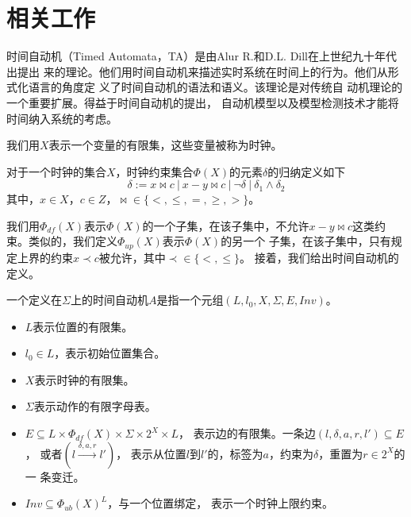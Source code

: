 
\chapter{相关工作}
\label{cha:related_work}


时间自动机（Timed Automata，TA）是由Alur R.和D.L. Dill在上世纪九十年代出提出
来的理论。他们用时间自动机来描述实时系统在时间上的行为。他们从形式化语言的角度定
义了时间自动机的语法和语义\cite{Alur:1994:TTA:180782.180519}。该理论是对传统自
动机理论\cite{Hopcroft:2006:IAT:1196416}的一个重要扩展。得益于时间自动机的提出，
自动机模型以及模型检测技术\cite{Clarke:2000:MC:332656}才能将时间纳入系统的考虑。

我们用$X$表示一个变量的有限集，这些变量被称为时钟。
\begin{definition}
	\label{def:constraint}
	对于一个时钟的集合$X$，时钟约束集合$\varPhi(X)$的元素$\delta$的归纳定义如下
	\begin{equation}
		\delta := x \bowtie c ~|~ x-y \bowtie c~|~ \neg\delta ~|~ \delta_1 
		\wedge \delta_2
	\end{equation}
	其中，$x\in X$，$c\in Z$，$\bowtie\in \{<,\leq,=,\geq,>\}$。
\end{definition}
我们用$\varPhi_{df}(X)$表示$\varPhi(X)$的一个子集，在该子集中，不允许$x-y 
\bowtie c$这类约束。类似的，我们定义$\varPhi_{up}(X)$表示$\varPhi(X)$的另一个
子集，在该子集中，只有规定上界的约束$x\prec c$被允许，其中$\prec \in \{<,\leq\}$。
接着，我们给出时间自动机的定义。

\begin{definition}
	\label{def:TA}
	一个定义在$\varSigma$上的时间自动机$A$是指一个元组$(L,l_0,X,\varSigma,E,Inv)$。
	\begin{itemize}
		\item $L$表示位置的有限集。
		\item $l_0\in L$，表示初始位置集合。
		\item $X$表示时钟的有限集。
		\item $\varSigma$表示动作的有限字母表。
		\item $E\subseteq L\times \varPhi_{df}(X)\times \varSigma \times 2^X\times L$，
		表示边的有限集。一条边$(l,\delta,a,r,l')\subseteq E$，
		或者$(l\stackrel{\delta,a,r}{\longrightarrow}l')$，
		表示从位置$l$到$l'$的，标签为$a$，约束为$\delta$，重置为$r\in 2^X$的一
		条变迁。
		\item $Inv\subseteq \varPhi_{ub}(X)^L$，与一个位置绑定，
		表示一个时钟上限约束。
	\end{itemize}
\end{definition}

